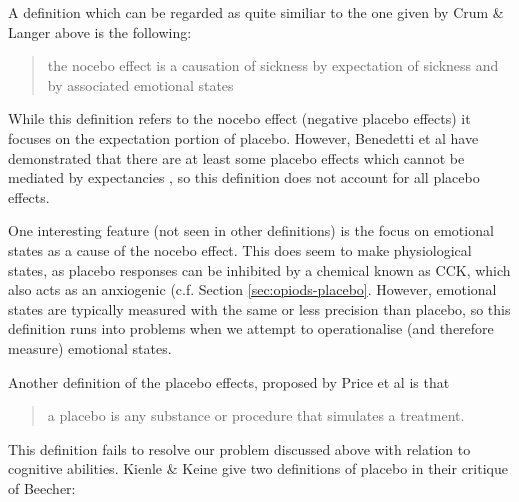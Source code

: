 A definition which can be regarded as quite similiar to the one given by Crum \& Langer above is the following:
\begin{quotation}
the nocebo effect is  a causation of sickness by expectation of sickness and by associated emotional states
\end{quotation}

While this definition refers to the nocebo effect (negative placebo effects) it focuses on the expectation portion of placebo. However, Benedetti et al have demonstrated that there are at least some placebo effects which cannot be mediated by expectancies \cite{Benedetti2003a}, so this definition does not account for all placebo effects. 

One interesting feature (not seen in other definitions) is the focus on emotional states as a cause of the nocebo effect. This does seem to make physiological states, as placebo responses can be inhibited by a chemical known as CCK, which also acts as an anxiogenic \cite{Benedetti2006c} (c.f. Section \ref{sec:opiods-placebo}. However, emotional states are typically measured with the same or less precision than placebo, so this definition runs into problems when we attempt to operationalise (and therefore measure) emotional states. 



Another definition of the placebo effects,  proposed by Price et al \cite{Price2008} is that

\begin{quotation}
  a placebo is any substance or procedure that simulates a treatment.
\end{quotation}

This definition fails to resolve our problem discussed above with relation to cognitive abilities. 
Kienle \& Keine give two definitions of placebo in their critique of Beecher:

